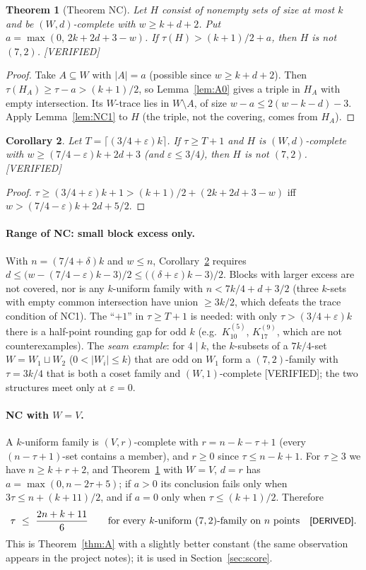 \documentclass[11pt]{article}
\newtheorem{theorem}{Theorem}[section]
\newtheorem{corollary}[theorem]{Corollary}
\theoremstyle{definition}
\newcommand{\st}[1]{\textsf{\small[#1]}}
\begin{document}
\begin{theorem}[Theorem NC]\label{thm:NC}
Let $H$ consist of nonempty sets of size at most $k$ and be $(W,d)$-complete with $w\ge k+d+2$. Put
$a=\max(0,\,2k+2d+3-w)$. If $\tau(H)>(k+1)/2+a$, then $H$ is not $(7,2)$. \st{VERIFIED}
\end{theorem}
\begin{proof}
Take $A\subseteq W$ with $|A|=a$ (possible since $w\ge k+d+2$). Then $\tau(H_A)\ge\tau-a>(k+1)/2$, so
Lemma~\ref{lem:A0} gives a triple in $H_A$ with empty intersection. Its $W$-trace lies in $W\setminus A$, of size
$w-a\le2(w-k-d)-3$. Apply Lemma~\ref{lem:NC1} to $H$ (the triple, not the covering, comes from $H_A$).
\end{proof}

\begin{corollary}\label{cor:NC}
Let $T=\lceil(3/4+\varepsilon)k\rceil$. If $\tau\ge T+1$ and $H$ is $(W,d)$-complete with
$w\ge(7/4-\varepsilon)k+2d+3$ (and $\varepsilon\le3/4$), then $H$ is not $(7,2)$. \st{VERIFIED}
\end{corollary}
\begin{proof}
$\tau\ge(3/4+\varepsilon)k+1>(k+1)/2+(2k+2d+3-w)$ iff $w>(7/4-\varepsilon)k+2d+5/2$.
\end{proof}

\paragraph{Range of NC: small block excess only.} With $n=(7/4+\delta)k$ and $w\le n$, Corollary~\ref{cor:NC}
requires $d\le\big(w-(7/4-\varepsilon)k-3\big)/2\le\big((\delta+\varepsilon)k-3\big)/2$. Blocks with larger excess are
not covered, nor is any $k$-uniform family with $n<7k/4+d+3/2$ (three $k$-sets with empty common intersection have
union $\ge3k/2$, which defeats the trace condition of NC1). The ``$+1$'' in $\tau\ge T+1$ is needed: with only
$\tau>(3/4+\varepsilon)k$ there is a half-point rounding gap for odd $k$ (e.g.\ $K^{(5)}_{10}$, $K^{(9)}_{17}$, which
are not counterexamples). The \emph{seam example}: for $4\mid k$, the $k$-subsets of a $7k/4$-set $W=W_1\sqcup W_2$
($0<|W_i|\le k$) that are odd on $W_1$ form a $(7,2)$-family with $\tau=3k/4$ that is both a coset family and
$(W,1)$-complete \st{VERIFIED}; the two structures meet only at $\varepsilon=0$.

\paragraph{NC with $W=V$.} A $k$-uniform family is $(V,r)$-complete with $r=n-k-\tau+1$ (every $(n-\tau+1)$-set contains a
member), and $r\ge0$ since $\tau\le n-k+1$. For $\tau\ge3$ we have $n\ge k+r+2$, and Theorem~\ref{thm:NC} with
$W=V$, $d=r$ has $a=\max(0,n-2\tau+5)$; if $a>0$ its conclusion fails only when $3\tau\le n+(k+11)/2$, and if $a=0$
only when $\tau\le(k+1)/2$. Therefore
\begin{equation}\label{eq:NCV}
\tau\ \le\ \frac{2n+k+11}{6}\qquad\text{for every $k$-uniform $(7,2)$-family on $n$ points}\quad\st{DERIVED}.
\end{equation}
This is Theorem~\ref{thm:A} with a slightly better constant (the same observation appears in the project notes); it is used in Section~\ref{sec:score}.
\end{document}
